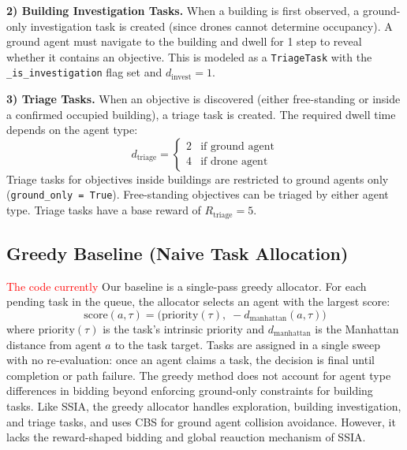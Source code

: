 \documentclass[conference]{IEEEtran}
\begin{document}
\textbf{2) Building Investigation Tasks.} When a building is first observed, a ground-only investigation task is created (since drones cannot determine occupancy). A ground agent must navigate to the building and dwell for 1 step to reveal whether it contains an objective. This is modeled as a \texttt{TriageTask} with the \texttt{\_is\_investigation} flag set and $d_{\text{invest}} = 1$.

\textbf{3) Triage Tasks.} When an objective is discovered (either free-standing or inside a confirmed occupied building), a triage task is created. The required dwell time depends on the agent type:
\begin{equation}
    d_{\text{triage}} = \begin{cases} 2 & \text{if ground agent} \\ 4 & \text{if drone agent} \end{cases}
\end{equation}
Triage tasks for objectives inside buildings are restricted to ground agents only (\texttt{ground\_only = True}). Free-standing objectives can be triaged by either agent type. Triage tasks have a base reward of $R_{\text{triage}} = 5$.

\subsection{Greedy Baseline (Naive Task Allocation)}

\textcolor{red}{The code currently}
Our baseline is a single-pass greedy allocator. For each pending task in the queue, the allocator selects an agent with the largest score:
\begin{equation}
    \text{score}(a, \tau) = \bigl(\text{priority}(\tau),\; -d_{\text{manhattan}}(a, \tau)\bigr)
    \label{eq:greedy}
\end{equation}
where $\text{priority}(\tau)$ is the task's intrinsic priority and $d_{\text{manhattan}}$ is the Manhattan distance from agent $a$ to the task target. Tasks are assigned in a single sweep with no re-evaluation: once an agent claims a task, the decision is final until completion or path failure. The greedy method does not account for agent type differences in bidding beyond enforcing ground-only constraints for building tasks. Like SSIA, the greedy allocator handles exploration, building investigation, and triage tasks, and uses CBS for ground agent collision avoidance. However, it lacks the reward-shaped bidding and global reauction mechanism of SSIA.
\end{document}
